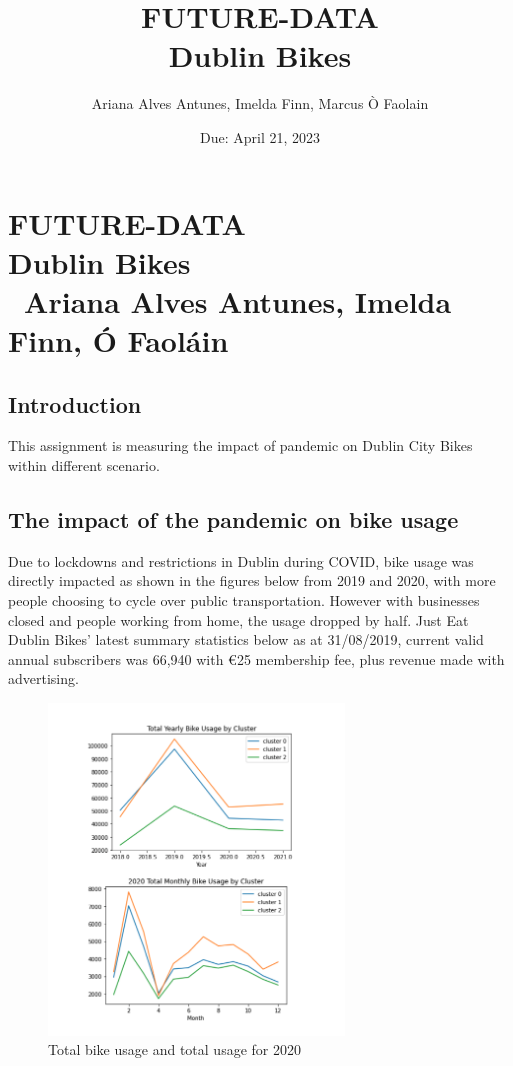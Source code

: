 \documentclass[11pt, singlecolumn, citestyle=authoryear]{elegantbook}
\title{FUTURE-DATA\\Dublin Bikes}
\date{Due: April 21, 2023}
\author{Ariana Alves Antunes, Imelda Finn, Marcus Ò Faolain}
\begin{document}
	\mainmatter 
	
\chapter*{FUTURE-DATA\\Dublin Bikes \\\ Ariana Alves Antunes, Imelda Finn, Ó Faoláin}

 	\section*{Introduction}
This assignment is measuring the impact of pandemic on Dublin City Bikes within different scenario. 
	

\section{The impact of the pandemic on bike usage}
	Due to lockdowns and restrictions in Dublin during COVID,  bike usage was directly impacted as shown in the figures below from 2019 and 2020, with more people  choosing to cycle over public transportation.  However with businesses closed and people working from home, the usage dropped by half. Just Eat Dublin Bikes’ latest summary statistics below as at 31/08/2019, current valid annual subscribers was 66,940 with €25 membership fee, plus revenue made with advertising. 

	\begin{figure}[h!]
		\includegraphics[width=0.7\textwidth]{../graphs/usaged_total_plus2020.png}
		\caption{Total bike usage and total usage for 2020}
		\label{fig:surface}\label{fig:model}
	\end{figure}
\end{document}
